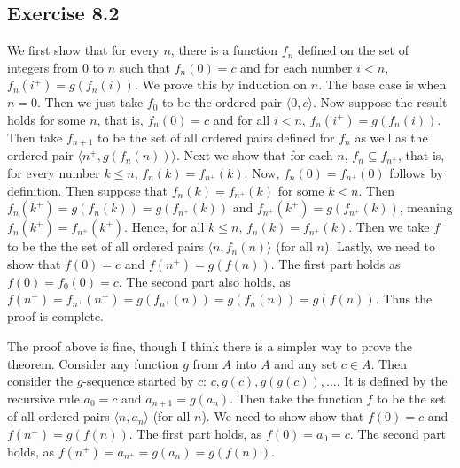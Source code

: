 \documentclass{article}
\theoremstyle{definition}
\begin{document}
\subsection*{Exercise 8.2}
We first show that for every $n$, there is a function $f_n$ defined on the set of integers from $0$ to $n$ such that $f_n(0)=c$ and for each number $i<n$, 
$f_n(i^+)=g(f_n(i))$. We prove this by induction on $n$. The base case is when $n=0$. Then we just take $f_0$ to be the ordered pair $\langle 0,c\rangle$. Now suppose the result holds 
for some $n$, that is, $f_n(0)=c$ and for all $i<n$, $f_n(i^+)=g(f_n(i))$. Then take $f_{n+1}$ to be the set of all ordered pairs defined for $f_n$ as well as the ordered pair 
$\langle n^+,g(f_n(n))\rangle$. Next we show that for each $n$, $f_n\subseteq f_{n^+}$, that is, 
for every number $k\le n$, $f_n(k)=f_{n^+}(k)$. Now, $f_n(0)=f_{n^+}(0)$ follows by definition. Then suppose that $f_n(k)=f_{n^+}(k)$ for some $k<n$. 
Then $f_n(k^+)=g(f_n(k))=g(f_{n^+}(k))$ and $f_{n^+}(k^+)=g(f_{n^+}(k))$, meaning $f_n(k^+)=f_{n^+}(k^+)$. Hence, for all $k\le n$, $f_n(k)=f_{n^+}(k)$. Then we take $f$ to be the the set of all 
ordered pairs $\langle n,f_n(n)\rangle$ (for all $n$). Lastly, we need to show that $f(0)=c$ and $f(n^+)=g(f(n))$. The first part holds as
$f(0)=f_0(0)=c$. The second part also holds, as $f(n^+)=f_{n^+}(n^+)=g(f_{n^+}(n))=g(f_n(n))=g(f(n))$. Thus the proof is complete. 

The proof above is fine, though I think there is a simpler way to prove the theorem. Consider any function $g$ from $A$ into $A$ and any set $c\in A$. Then consider the $g$-sequence 
started by $c$: $c,g(c),g(g(c)),...$. It is defined by the recursive rule $a_0=c$ and $a_{n+1}=g(a_n)$. Then take the function $f$ to be the set of all ordered pairs 
$\langle n,a_n\rangle$ (for all $n$). We need to show show that $f(0)=c$ and $f(n^+)=g(f(n))$. The first part holds, as $f(0)=a_0=c$. The second part holds, as 
$f(n^+)=a_{n^+}=g(a_n)=g(f(n))$.
\end{document}
